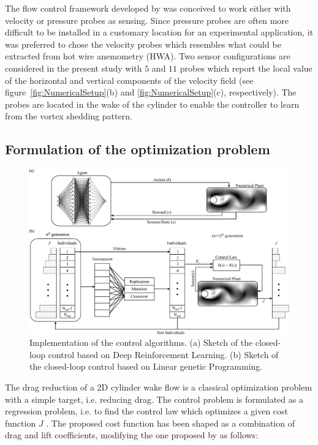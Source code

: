 The flow control framework developed by \citet{rabault2019JFM} was conceived to work either with velocity or pressure probes as sensing. Since pressure probes are often more difficult to be installed in a customary location for an experimental application, it was preferred to chose the velocity probes which resembles what could be extracted from hot wire anemometry (HWA). Two sensor configurations are considered in the present study with $5$ and $11$ probes which report the local value of the horizontal and vertical components of the velocity field (see figure~\ref{fig:NumericalSetup}(b) and \ref{fig:NumericalSetup}(c), respectively). The probes are located in the wake of the cylinder to enable the controller to learn from the vortex shedding pattern.

\subsection{Formulation of the optimization problem}

\begin{figure}
    \centering
    \includegraphics[width=0.99\linewidth]{Figures/2.pdf}
    \caption{Implementation of the control algorithms. (a) Sketch of the closed-loop control based on Deep Reinforcement Learning. (b) Sketch of the closed-loop control based on Linear genetic Programming.}
    \label{fig:LearningLoop}
\end{figure}

The drag reduction of a 2D cylinder wake flow is a classical optimization problem with a simple target, i.e. reducing drag. The control problem is formulated as a regression problem, i.e. to find the control law which optimizes a given cost function $J$ \citep{duriez2017book}. The proposed cost function has been shaped as a combination of drag and lift coefficients, modifying the one proposed by \citet{rabault2019JFM} as follows:

